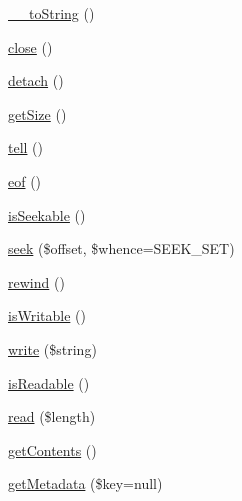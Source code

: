 \begin{DoxyCompactItemize}
\item 
\hyperlink{interfacePsr_1_1Http_1_1Message_1_1StreamInterface_a72df4e8851ae1a81087f3415fd6d73cd}{\+\_\+\+\_\+to\+String} ()
\item 
\hyperlink{interfacePsr_1_1Http_1_1Message_1_1StreamInterface_a0bbd0c821da0ee0c319f9867ff77c598}{close} ()
\item 
\hyperlink{interfacePsr_1_1Http_1_1Message_1_1StreamInterface_a1670dba880a8c14690746732960d4c9c}{detach} ()
\item 
\hyperlink{interfacePsr_1_1Http_1_1Message_1_1StreamInterface_a85b9ff28e3ee39d95a47e623d866cf76}{get\+Size} ()
\item 
\hyperlink{interfacePsr_1_1Http_1_1Message_1_1StreamInterface_a9aa2f88a38f496d74100f42ddf0656ef}{tell} ()
\item 
\hyperlink{interfacePsr_1_1Http_1_1Message_1_1StreamInterface_a502cc5ca370c6925b78d95d86d68777c}{eof} ()
\item 
\hyperlink{interfacePsr_1_1Http_1_1Message_1_1StreamInterface_ad4a27548fd51bd12390d798981a1622b}{is\+Seekable} ()
\item 
\hyperlink{interfacePsr_1_1Http_1_1Message_1_1StreamInterface_a96ee062dc6cf4022d655dd15eaa81208}{seek} (\$offset, \$whence=S\+E\+E\+K\+\_\+\+S\+ET)
\item 
\hyperlink{interfacePsr_1_1Http_1_1Message_1_1StreamInterface_a48721ef4d5097250a3f94515938393c9}{rewind} ()
\item 
\hyperlink{interfacePsr_1_1Http_1_1Message_1_1StreamInterface_a79287940d75d1951b831879fdc493883}{is\+Writable} ()
\item 
\hyperlink{interfacePsr_1_1Http_1_1Message_1_1StreamInterface_aabf9fe3e09f85753834cdb69bbdf3c3d}{write} (\$string)
\item 
\hyperlink{interfacePsr_1_1Http_1_1Message_1_1StreamInterface_aecf78407aa241622ae200a9faa471d32}{is\+Readable} ()
\item 
\hyperlink{interfacePsr_1_1Http_1_1Message_1_1StreamInterface_ad41b4afe827e179dfb4b988e98cccb12}{read} (\$length)
\item 
\hyperlink{interfacePsr_1_1Http_1_1Message_1_1StreamInterface_a77f73d536f77e4a4e281d548ee905276}{get\+Contents} ()
\item 
\hyperlink{interfacePsr_1_1Http_1_1Message_1_1StreamInterface_ac5e77fbbc7ba4235a4041d966f3aaa84}{get\+Metadata} (\$key=null)
\end{DoxyCompactItemize}


